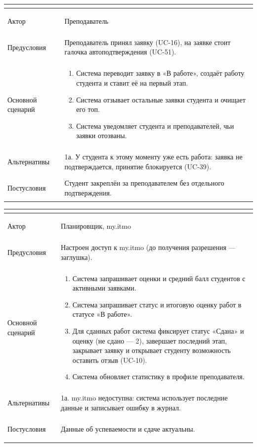 \documentclass[a4paper,12pt]{article}
\newenvironment{ucd}[3]{%
  \needspace{10\baselineskip}
  \begin{longtable}{|>{\bfseries\raggedright\arraybackslash}p{3.0cm}|p{11.8cm}|}
  \hline
  \multicolumn{2}{|l|}{\textbf{#1.\ #2}}\\ \hline
  Актор & #3\\ \hline
}{\end{longtable}}
\newcommand{\steps}[1]{\begin{enumerate}[nosep,leftmargin=*]#1\end{enumerate}}
\begin{document}
\begin{ucd}{UC-29}{Подтвердить заявку автоматически}{Преподаватель}
Предусловия & Преподаватель принял заявку (UC-16), на заявке стоит галочка автоподтверждения (UC-51).\\ \hline
Основной сценарий & \steps{
 \item Система переводит заявку в «В работе», создаёт работу студента и ставит её на первый этап.
 \item Система отзывает остальные заявки студента и очищает его топ.
 \item Система уведомляет студента и преподавателей, чьи заявки отозваны.}\\ \hline
Альтернативы & 1а. У студента к этому моменту уже есть работа: заявка не подтверждается, принятие блокируется (UC-39).\\ \hline
Постусловия & Студент закреплён за преподавателем без отдельного подтверждения.\\ \hline
\end{ucd}

\begin{ucd}{UC-30}{Получить данные студента и статус сдачи из my.itmo}{Планировщик, my.itmo}
Предусловия & Настроен доступ к my.itmo (до получения разрешения — заглушка).\\ \hline
Основной сценарий & \steps{
 \item Система запрашивает оценки и средний балл студентов с активными заявками.
 \item Система запрашивает статус и итоговую оценку работ в статусе «В работе».
 \item Для сданных работ система фиксирует статус «Сдана» и оценку (не сдано — 2), завершает последний этап, закрывает заявку и открывает студенту возможность оставить отзыв (UC-10).
 \item Система обновляет статистику в профиле преподавателя.}\\ \hline
Альтернативы & 1а. my.itmo недоступна: система использует последние данные и записывает ошибку в журнал.\\ \hline
Постусловия & Данные об успеваемости и сдаче актуальны.\\ \hline
\end{ucd}
\end{document}
